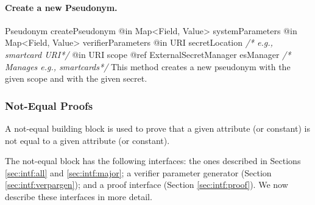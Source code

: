       \paragraph{Create a new Pseudonym.}
      \begin{method}
      {Pseudonym}
      {createPseudonym}
      {
        {@in Map<Field, Value> systemParameters}
        {@in Map<Field, Value> verifierParameters}
        {@in URI secretLocation \textrm{\emph{/* e.g., smartcard URI*/}}}
        {@in URI scope}
        {@ref ExternalSecretManager esManager \textrm{\emph{/* Manages e.g., smartcards*/}}}
      }
      This method creates a new pseudonym with the given scope and with the given secret.
      \end{method}

    \subsubsection{Not-Equal Proofs}
    \notimplemented
    
    A not-equal building block is used to prove that a given attribute (or constant)
    is not equal to a given attribute (or constant).

    The not-equal block has the following interfaces:
    the ones described in Sections \ref{sec:intf:all} and \ref{sec:intf:major};
    a verifier parameter generator (Section \ref{sec:intf:verpargen});
    and a proof interface (Section \ref{sec:intf:proof}).
      We now describe these interfaces in more detail.

